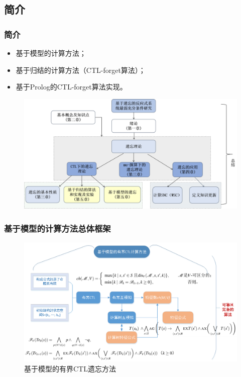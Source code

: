 \documentclass[9pt, CJK]{beamer}
\begin{document}
\subsection{简介}
\begin{frame}
	\frametitle{简介}
	\begin{itemize}
		\item 基于模型的计算方法；
		\item 基于归结的计算方法（CTL-forget算法）；
		\item 基于Prolog的CTL-forget算法实现。
	\end{itemize}
\begin{figure}
	\includegraphics[scale=0.3]{figures/frameF5}
\end{figure}
\end{frame}

\begin{frame}
	\frametitle{基于模型的计算方法总体框架}
	\begin{figure}
		\includegraphics[scale=0.45]{figures/model-basedFrame}
		\caption{基于模型的有界CTL遗忘方法}
	\end{figure}
\end{frame}
\end{document}
